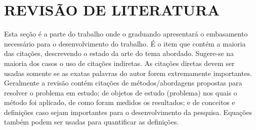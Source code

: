 
\chapter{REVISÃO DE LITERATURA} %
\label{revisao}

Esta seção é a parte do trabalho onde o graduando apresentará o embasamento necessário para o desenvolvimento do trabalho. É o item que contém a maioria das citações, descrevendo o estado da arte do tema abordado. Sugere-se na maioria dos casos o uso de citações indiretas. As citações diretas devem ser usadas somente se as exatas palavras do autor forem extremamente importantes. Geralmente a revisão contém citações de métodos/abordagens propostas para resolver o problema em estudo; de objetos de estudo (problema) nos quais o método foi aplicado, de como foram medidos os resultados; e de conceitos e definições caso sejam importantes para o desenvolvimento da pesquisa. Equações também podem ser usadas para quantificar as definições.